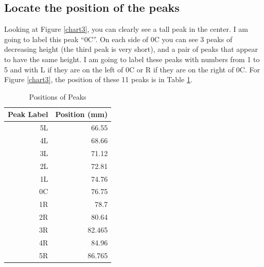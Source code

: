 \subsection{Locate the position of the peaks}
Looking at Figure \ref{chart3}, you can clearly see a tall peak in the center. I am going to label this peak ``0C''. On each side of 0C you can see 3 peaks of decreasing height (the third peak is very short), and a pair of peaks that appear to have the same height. I am going to label these peaks with numbers from 1 to 5 and with L if they are on the left of 0C or R if they are on the right of 0C. For Figure \ref{chart3}, the position of these 11 peaks is in Table \ref{table.pos}.
\begin{table}[ht!]
	\centering
	\begin{tabular}{|r|r|} \hline
		Peak Label & Position (mm) \\
		\hline
		5L & 66.55 \\
		4L & 68.66 \\
		3L & 71.12 \\
		2L & 72.81 \\
		1L & 74.76 \\
		0C & 76.75 \\
		1R & 78.7 \\
		2R & 80.64 \\
		3R & 82.465 \\
		4R & 84.96 \\
		5R & 86.765 \\
		\hline
	\end{tabular}
	\caption{Positions of Peaks}
	\label{table.pos}
\end{table}

